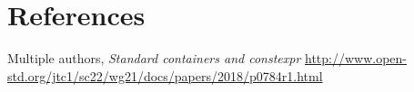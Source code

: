 \documentclass{wg21}
\begin{document}
\section{References}
\renewcommand{\section}[2]{}%
\begin{thebibliography}{9}

  Multiple authors,
  \emph{Standard containers and constexpr}\newline
  \url{http://www.open-std.org/jtc1/sc22/wg21/docs/papers/2018/p0784r1.html}

\end{thebibliography}
\end{document}

